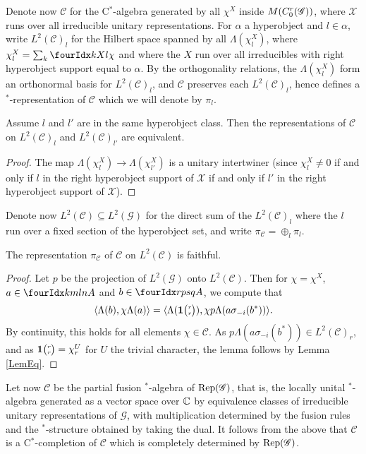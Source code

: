 Denote now $\mathcal{C}$ for the C$^*$-algebra generated by all $\chi^X$ inside $M(C^{r}_{0}(\mathscr{G}))$, where $\mathscr{X}$ runs over all irreducible unitary representations. For $\alpha$ a hyperobject and $l\in \alpha$, write  $L^2(\mathcal{C})_l$ for the Hilbert space spanned by all $\Lambda(\chi^X_l)$, where $\chi^X_l = \sum_{k} \Gr{\chi}{}{X}{k}{l}$ and where the $X$ run over all irreducibles with right hyperobject support equal to $\alpha$. By the orthogonality relations, the $\Lambda(\chi^X_l)$ form an orthonormal basis for $L^2(\mathcal{C})_l$, and $\mathcal{C}$ preserves each $L^2(\mathcal{C})_l$, hence defines a $^*$-representation of $\mathcal{C}$ which we will denote by $\pi_l$. 

\begin{Lem}\label{LemEq} Assume $l$ and $l'$ are in the same hyperobject class. Then the representations of $\mathcal{C}$ on $L^2(\mathcal{C})_l$ and $L^2(\mathcal{C})_{l'}$ are equivalent.
\end{Lem} 
\begin{proof} The map $\Lambda(\chi^X_l)\rightarrow \Lambda(\chi^X_{l'})$ is a unitary intertwiner (since $\chi^X_l\neq 0$ if and only if $l$ in the right hyperobject support of $\mathscr{X}$ if and only if $l'$ in the right hyperobject support of $\mathscr{X}$).
\end{proof} 

Denote now $L^2(\mathcal{C})\subseteq L^2(\mathscr{G})$ for the direct sum of the $L^2(\mathcal{C})_l$ where the $l$ run over a fixed section of the hyperobject set, and write $\pi_{\mathcal{C}}= \oplus_l \pi_l$. 
 
\begin{Lem} The representation $\pi_{\mathcal{C}}$ of $\mathcal{C}$ on $L^2(\mathcal{C})$ is faithful.
\end{Lem} 

\begin{proof} Let $p$ be the projection of $L^2(\mathscr{G})$ onto $L^2(\mathcal{C})$. Then for $\chi = \chi^X$, $a\in \Gr{A}{k}{l}{m}{n}$ and $b\in \Gr{A}{r}{s}{p}{q}$, we compute that \[\langle \Lambda(b),\chi \Lambda(a)\rangle =  \langle \Lambda( \mathbf{1}{\tiny {\begin{pmatrix} r\\r\end{pmatrix}}}),\chi p\Lambda(a\sigma_{-i}(b^*))\rangle.\] By continuity, this holds for all elements $\chi \in \mathcal{C}$. As $p\Lambda(a\sigma_{-i}(b^*)) \in L^2(\mathcal{C})_r$, and as $\mathbf{1}{\tiny {\begin{pmatrix} r\\r\end{pmatrix}}} = \chi^U_r$ for $U$ the trivial character, the lemma follows by Lemma \ref{LemEq}.
\end{proof}

Let now $\mathscr{C}$ be the partial fusion $^*$-algebra of $\mathrm{Rep}(\mathscr{G})$, that is, the locally unital $^*$-algebra generated as a vector space over $\mathbb{C}$ by equivalence classes of irreducible unitary representations of $\mathscr{G}$, with multiplication determined by the fusion rules and the $^*$-structure obtained by taking the dual. It follows from the above that $\mathcal{C}$ is a C$^*$-completion of $\mathscr{C}$ which is completely determined by $\mathrm{Rep}(\mathscr{G})$.

